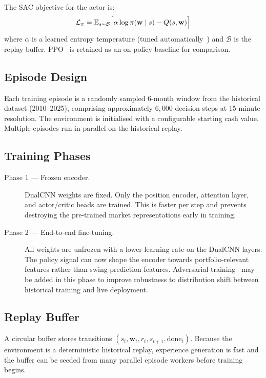 \documentclass[11pt, a4paper]{article}
\begin{document}
The SAC objective for the actor is:
\[
    \mathcal{L}_\pi = \mathbb{E}_{s \sim \mathcal{B}}\Bigl[
        \alpha \log \pi(\mathbf{w} \mid s) - Q(s, \mathbf{w})
    \Bigr]
\]
where $\alpha$ is a learned entropy temperature (tuned
automatically~\cite{haarnoja2018sacapps}) and $\mathcal{B}$ is the replay
buffer. PPO~\cite{schulman2017ppo} is retained as an on-policy baseline for
comparison.

\subsection{Episode Design}

Each training episode is a randomly sampled 6-month window from the historical
dataset (2010--2025), comprising approximately $6{,}000$ decision steps at
15-minute resolution. The environment is initialised with a configurable
starting cash value. Multiple episodes run in parallel on the historical
replay.

\subsection{Training Phases}

\begin{description}
    \item[Phase 1 --- Frozen encoder.]
        DualCNN weights are fixed. Only the position encoder, attention layer,
        and actor/critic heads are trained. This is faster per step and
        prevents destroying the pre-trained market representations early in
        training.
    \item[Phase 2 --- End-to-end fine-tuning.]
        All weights are unfrozen with a lower learning rate on the DualCNN
        layers. The policy signal can now shape the encoder towards
        portfolio-relevant features rather than swing-prediction features.
        Adversarial training~\cite{liang2018adversarial} may be added in this
        phase to improve robustness to distribution shift between historical
        training and live deployment.
\end{description}

\subsection{Replay Buffer}

A circular buffer stores transitions
$(s_t, \mathbf{w}_t, r_t, s_{t+1}, \mathrm{done}_t)$. Because the environment
is a deterministic historical replay, experience generation is fast and the
buffer can be seeded from many parallel episode workers before training begins.
\end{document}
